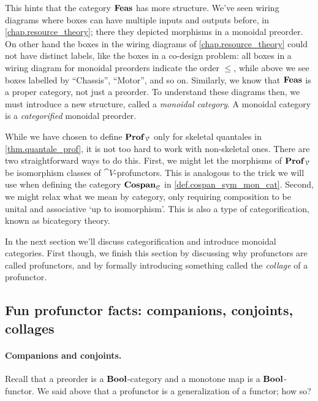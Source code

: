 \documentclass[7Sketches]{subfiles}
\begin{document}
This hints that the category $\mathbf{Feas}$ has more structure. We've seen wiring
diagrams where boxes can have multiple inputs and outputs before, in
\cref{chap.resource_theory}; there they depicted morphisms in a monoidal
preorder. On other hand the boxes in the wiring diagrams of
\cref{chap.resource_theory} could not have distinct labels, like the boxes in a
co-design problem: all boxes in a wiring diagram for monoidal preorders indicate
the order $\le$, while above we see boxes labelled by ``Chassis'', ``Motor'',
and so on. Similarly, we know that $\mathbf{Feas}$ is a proper category, not just a
preorder. To understand these diagrams then, we must introduce a new structure,
called a \emph{monoidal category}. A monoidal category is a \emph{categorified}
monoidal preorder. 


\begin{remark}%
While we have chosen to define $\mathbf{Prof}_{\mathcal{V}}$ only for skeletal quantales in
\cref{thm.quantale_prof}, it is not too hard to work with non-skeletal ones.
There are two straightforward ways to do this. First, we might let the morphisms
of $\mathbf{Prof}_{\mathcal{V}}$ be isomorphism classes of $\cat{V}$-profunctors. This is
analogous to the trick we will use when defining the category $\mathbf{Cospan}_{\mathcal{C}}$
in \cref{def.cospan_sym_mon_cat}.  Second, we might relax what we mean by
category, only requiring composition to be unital and associative `up to
isomorphism'. This is also a type of categorification, known as bicategory theory.%
%
%
\end{remark}

In the next section we'll discuss categorification and introduce monoidal
categories. First though, we finish this section by discussing why profunctors
are called profunctors, and by formally introducing something called the \emph{collage} of a profunctor.

%

\subsection{Fun profunctor facts: companions, conjoints, collages}


\paragraph{Companions and conjoints.}
Recall that a preorder is a $\mathbf{Bool}$-category and a monotone map is a $\mathbf{Bool}$-functor. We said above that a profunctor is a generalization of a functor; how so?
\end{document}
